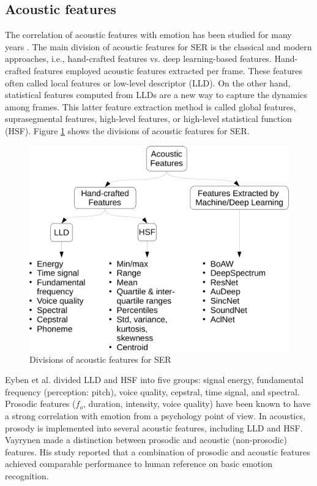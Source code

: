 \subsection{Acoustic features}
The correlation of acoustic features with emotion has been studied for many
years \cite{Scherer2005, Mairano}. The main division of acoustic features for
SER is the classical and modern approaches, i.e., hand-crafted features vs.
deep learning-based features. Hand-crafted features employed acoustic features
extracted per frame. These features often called local features or low-level
descriptor (LLD). On the other hand, statistical features computed from LLDs
are a new way to capture the dynamics among frames. This latter feature
extraction method is called global features, suprasegmental features,
high-level features, or high-level statistical function (HSF). Figure
\ref{fig:aco_feat} shows the divisions of acoustic features for SER.

\begin{figure}[htbp]
    \centering
    \includegraphics[width=.7\textwidth]{../fig/acoustic_features-crop.pdf}
    \caption{Divisions of acoustic features for SER}
    \label{fig:aco_feat}
\end{figure}

Eyben et al. \cite{Eyben2010} divided LLD and HSF into five groups: signal
energy, fundamental frequency (perception: pitch), voice quality, cepstral,
time signal, and spectral. Prosodic features ($f_o$, duration, intensity, voice
quality) have been known to have a strong correlation with emotion
\cite{Frick1985,Mozziconacci2002,Fritz2016} from a psychology point of view. In
acoustics, prosody is implemented into several acoustic features, including LLD
and HSF. Vayrynen \cite{Vayrynen2014} made a distinction between prosodic and
acoustic (non-prosodic) features. His study reported that a combination of
prosodic and acoustic features achieved comparable performance to human
reference on basic emotion recognition.

